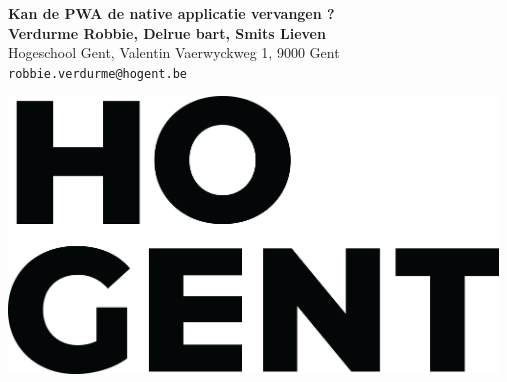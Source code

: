 \documentclass[a0,portrait]{a0poster}
\begin{document}


\begin{minipage}[t]{0.75\linewidth}
\VeryHuge \color{HoGentAccent1} \textbf{Kan de PWA de native applicatie vervangen ?} \color{Black}\\ %
\huge \textbf{Verdurme Robbie, Delrue bart, Smits Lieven}\\[0.5cm] %
\huge Hogeschool Gent, Valentin Vaerwyckweg 1, 9000 Gent\\[0.4cm] %
\Large \texttt{robbie.verdurme@hogent.be} \\
\end{minipage}
%
\begin{minipage}[t]{0.25\linewidth}
\includegraphics[width=13cm,right]{figures/HOGENT_Logo_Pos_rgb.png} 

\end{minipage}

\vspace{1cm} %

\end{document}
